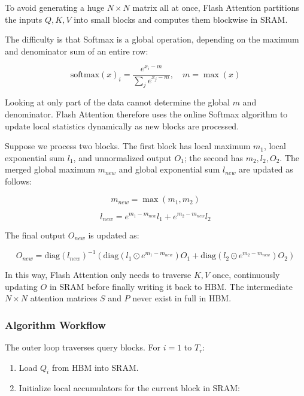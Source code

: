 To avoid generating a huge \(N \times N\) matrix all at once, Flash Attention partitions the inputs \(Q,K,V\) into small blocks and computes them blockwise in SRAM.

The difficulty is that Softmax is a global operation, depending on the maximum and denominator sum of an entire row:

\[
\mathrm{softmax}(x)_i = \frac{e^{x_i-m}}{\sum_j e^{x_j-m}},\quad m = \max(x)
\]

Looking at only part of the data cannot determine the global \(m\) and denominator. Flash Attention therefore uses the online Softmax algorithm to update local statistics dynamically as new blocks are processed.

Suppose we process two blocks. The first block has local maximum \(m_1\), local exponential sum \(l_1\), and unnormalized output \(O_1\); the second has \(m_2,l_2,O_2\). The merged global maximum \(m_{new}\) and global exponential sum \(l_{new}\) are updated as follows:

\[
m_{new} = \max(m_1,m_2)
\]

\[
l_{new} = e^{m_1-m_{new}}l_1 + e^{m_2-m_{new}}l_2
\]

The final output \(O_{new}\) is updated as:

\[
O_{new} = \mathrm{diag}(l_{new})^{-1}\left(\mathrm{diag}\left(l_1 \odot e^{m_1-m_{new}}\right)O_1 + \mathrm{diag}\left(l_2 \odot e^{m_2-m_{new}}\right)O_2\right)
\]

In this way, Flash Attention only needs to traverse \(K,V\) once, continuously updating \(O\) in SRAM before finally writing it back to HBM. The intermediate \(N \times N\) attention matrices \(S\) and \(P\) never exist in full in HBM.

\hypertarget{algorithm-workflow}{%
\subsubsection{Algorithm Workflow}\label{algorithm-workflow}}

The outer loop traverses query blocks. For \(i = 1\) to \(T_r\):

\begin{enumerate}
\def\labelenumi{\arabic{enumi}.}
\tightlist
\item
  Load \(Q_i\) from HBM into SRAM.
\item
{}
  Initialize local accumulators for the current block in SRAM:
\end{enumerate}

